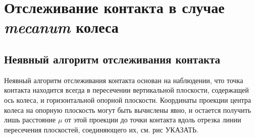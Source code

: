 %

\section{Отслеживание контакта в случае \textit{mecanum} колеса}

%
\subsection{Неявный алгоритм отслеживания контакта}

Неявный алгоритм отслеживания контакта основан на наблюдении, что точка контакта находится всегда в пересечении вертикальной плоскости, содержащей ось колеса, и горизонтальной опорной плоскости. Координаты проекции центра колеса на опорную плоскость могут быть вычислены явно, и остается получить лишь расстояние $\mu$ от этой проекции до точки контакта вдоль отрезка линии пересечения плоскостей, соединяющего их, см. рис УКАЗАТЬ.

